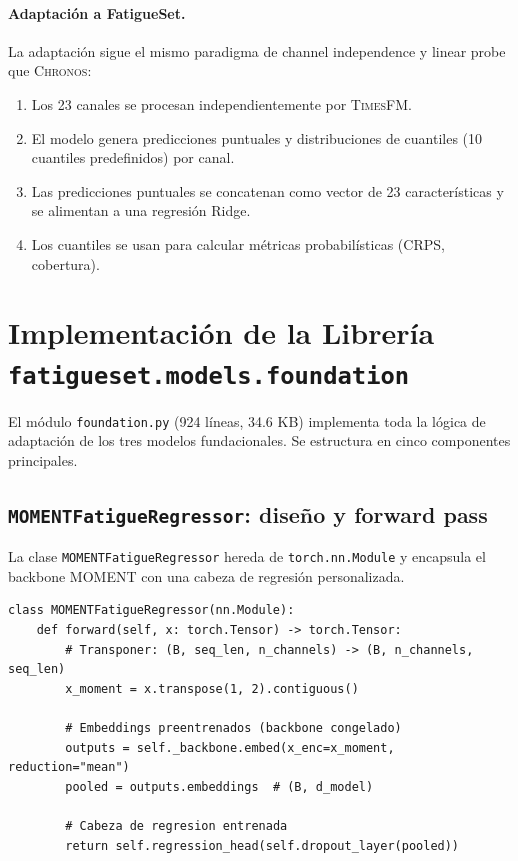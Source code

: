 \documentclass[12pt, a4paper]{article}
\newcommand{\code}[1]{\texttt{#1}}
\newcommand{\moment}{\textsc{MOMENT}}
\newcommand{\chronos}{\textsc{Chronos}}
\newcommand{\timesfm}{\textsc{TimesFM}}
\begin{document}
\paragraph{Adaptación a FatigueSet.}
La adaptación sigue el mismo paradigma de channel independence y linear probe que \chronos{}:
\begin{enumerate}
    \item Los 23 canales se procesan independientemente por \timesfm{}.
    \item El modelo genera predicciones puntuales y distribuciones de cuantiles (10 cuantiles predefinidos) por canal.
    \item Las predicciones puntuales se concatenan como vector de 23 características y se alimentan a una regresión Ridge.
    \item Los cuantiles se usan para calcular métricas probabilísticas (CRPS, cobertura).
\end{enumerate}


\section{Implementación de la Librería \code{fatigueset.models.foundation}}
\label{sec:implementacion_foundation}

El módulo \code{foundation.py} (924 líneas, 34.6 KB) implementa toda la lógica de adaptación de los tres modelos fundacionales. Se estructura en cinco componentes principales.

\subsection{\code{MOMENTFatigueRegressor}: diseño y forward pass}

La clase \code{MOMENTFatigueRegressor} hereda de \code{torch.nn.Module} y encapsula el backbone \moment{} con una cabeza de regresión personalizada.

\begin{lstlisting}[caption={Paso forward de MOMENTFatigueRegressor (simplificado).}, label={lst:moment_forward}]
class MOMENTFatigueRegressor(nn.Module):
    def forward(self, x: torch.Tensor) -> torch.Tensor:
        # Transponer: (B, seq_len, n_channels) -> (B, n_channels, seq_len)
        x_moment = x.transpose(1, 2).contiguous()

        # Embeddings preentrenados (backbone congelado)
        outputs = self._backbone.embed(x_enc=x_moment, reduction="mean")
        pooled = outputs.embeddings  # (B, d_model)

        # Cabeza de regresion entrenada
        return self.regression_head(self.dropout_layer(pooled))
\end{lstlisting}
\end{document}
